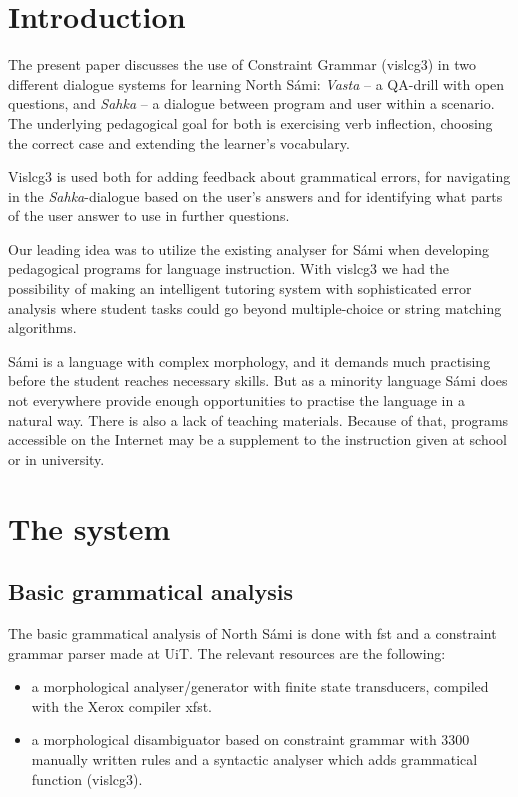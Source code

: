 \documentclass[11pt]{article}
\begin{document}
\section{Introduction} 

The present paper discusses the use of Constraint Grammar (vislcg3) in two different dialogue systems for learning North Sámi: \textit{Vasta} -- a QA-drill with open questions, and \textit{Sahka} -- a  dialogue between program and user within a scenario. The underlying pedagogical goal for both is exercising verb inflection, choosing the correct case and extending the learner's vocabulary. 

Vislcg3 is used both for adding feedback about grammatical errors, for navigating in the \textit{Sahka}-dialogue based on the user's answers and for identifying what parts of the user answer to use in further questions. 

Our leading idea was to utilize the existing analyser for Sámi when developing pedagogical programs for language instruction. With vislcg3 we had the possibility of making an intelligent tutoring system with sophisticated error analysis where student tasks could go beyond multiple-choice or string matching algorithms. 

Sámi is a language with complex morphology, and it demands much practising before the student reaches necessary skills. But as a minority language Sámi does not everywhere provide enough opportunities to practise the language in a natural way. There is also a lack of teaching materials. Because of that, programs accessible on the Internet may be a supplement to the instruction given at school or in university. 

\section{The system}
\subsection{Basic grammatical analysis}
The basic grammatical analysis of North Sámi is done with fst and a constraint grammar parser made at UiT. The relevant resources are the following:

\begin{itemize}
\item a morphological analyser/generator with finite state transducers, compiled with the Xerox compiler xfst.  
\item a morphological disambiguator based on constraint grammar with 3300 manually written rules and a syntactic analyser which adds grammatical function (vislcg3). 
\end{itemize} 
\end{document}
